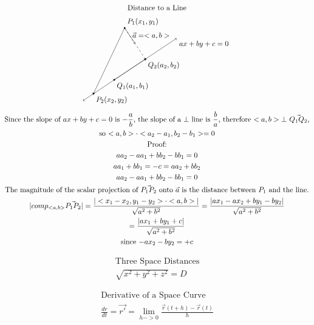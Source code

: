 \documentclass{article}
\begin{document}
\begin{gather*}
    \text{Distance to a Line}
    \\
    \begin{tikzpicture}
        \draw[<->](-1.5,-1)--(3,2);
        \filldraw[black] (-1,-2/3) circle(1pt) node[anchor=north west] {$P_2(x_2,y_2)$};
        \node[anchor=north west] at (3,2) {$ax+by+c=0$};
        \draw[->](0,0)--(1.5,1);
        \filldraw[black] (0,0) circle(1pt) node[anchor=north west] {$Q_1(a_1,b_1)$};
        \filldraw[black] (1.5,1) circle(1pt) node[anchor=north west] {$Q_2(a_2,b_2)$};
        \draw[dashed](1.5,1)--(0.5,2.5);
        \filldraw[black] (0.5,2.5) circle(1pt) node[anchor=south west] {$P_1(x_1,y_1)$};
        \draw[->](0.5,2.5)--(-1,-2/3);
        \draw[->](0.5,2.5)--(1,1.75);
        \node[anchor=west] at (0.75,2.125) {$\vec{a}=<a,b>$};
    \end{tikzpicture}
    \\
    \text{Since the slope of $ax+by+c=0$ is $-\frac{a}{b}$, the slope of a $\bot$ line is $\frac{b}{a}$, therefore $<a,b>\bot$ $\vec{Q_1Q_2}$,}
    \\
    \text{so $<a,b>\cdot<a_2-a_1,b_2-b_1>=0$}
    \\
    \text{Proof:}
    \\
    aa_2-aa_1+bb_2-bb_1=0
    \\
    aa_1+bb_1=-c=aa_2+bb_2
    \\
    aa_2-aa_1+bb_2-bb_1=0
    \\
    \text{The magnitude of the scalar projection of $\vec{P_1P_2}$ onto $\vec{a}$ is the distance between $P_1$ and the line.}
    \\
    |comp_{<a,b>} \vec{P_1P_2}|=\frac{|<x_1-x_2,y_1-y_2>\cdot <a,b>|}{\sqrt{a^2+b^2}}=\frac{|ax_1-ax_2+by_1-by_2|}{\sqrt{a^2+b^2}}
    \\
    =\frac{|ax_1+by_1+c|}{\sqrt{a^2+b^2}}
    \\
    \text{since $-ax_2-by_2=+c$}
\end{gather*}

\begin{gather*}
    \text{Three Space Distances}
    \\
    \sqrt{x^2+y^2+z^2}=D
\end{gather*}

\begin{gather*}
    \text{Derivative of a Space Curve}
    \\
    \frac{dr}{dt}=\vec{r'}=\lim_{h->0}\frac{\vec{r}(t+h)-\vec{r}(t)}{h}
\end{gather*}
\end{document}
